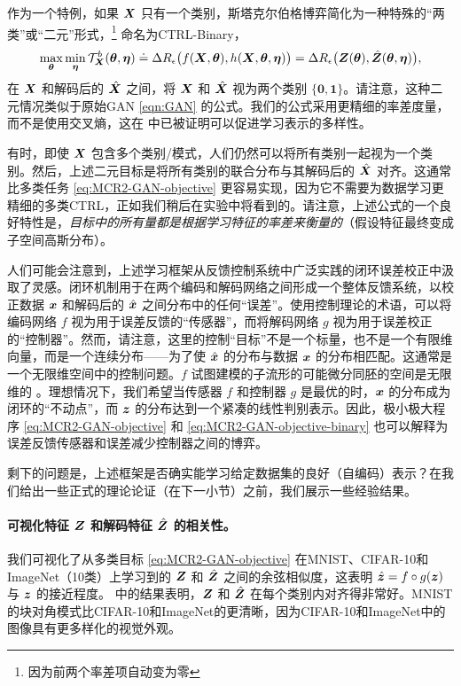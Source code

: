 \documentclass[../../book-main_zh.tex]{subfiles}
\begin{document}
作为一个特例，如果 $\bm{X}$ 只有一个类别，斯塔克尔伯格博弈简化为一种特殊的“两类”或“二元”形式，\footnote{因为前两个率差项自动变为零} 命名为CTRL-Binary，
\begin{equation}
 \max_{\bm \theta} \min_{\bm \eta} \mathcal{T}^b_{\bm{X}}(\bm \theta, \bm \eta) \doteq \Delta R_\epsilon\big(f(\bm{X},\bm \theta), h(\bm{X},\bm \theta,\bm \eta)\big) = \Delta R_\epsilon\big(\bm{Z}(\bm \theta), \hat {\bm{Z}}(\bm \theta, \bm \eta)\big), 
    \label{eq:MCR2-GAN-objective-binary}
\end{equation}
在 $\bm{X}$ 和解码后的 $\hat{\bm{X}}$ 之间，将 $\bm{X}$ 和 $\hat {\bm{X}}$ 视为两个类别 $\{\bm 0, \bm 1\}$。请注意，这种二元情况类似于原始GAN \eqref{eqn:GAN} 的公式。我们的公式采用更精细的率差度量，而不是使用交叉熵，这在  中已被证明可以促进学习表示的多样性。

有时，即使 $\bm{X}$ 包含多个类别/模式，人们仍然可以将所有类别一起视为一个类别。然后，上述二元目标是将所有类别的联合分布与其解码后的 $\hat {\bm{X}}$ 对齐。这通常比多类任务 \eqref{eq:MCR2-GAN-objective} 更容易实现，因为它不需要为数据学习更精细的多类CTRL，正如我们稍后在实验中将看到的。请注意，上述公式的一个良好特性是，{\em 目标中的所有量都是根据学习特征的率差来衡量的}（假设特征最终变成子空间高斯分布）。

人们可能会注意到，上述学习框架从反馈控制系统中广泛实践的闭环误差校正中汲取了灵感。闭环机制用于在两个编码和解码网络之间形成一个整体反馈系统，以校正数据 $\bm{x}$ 和解码后的 $\hat {\bm{x}}$ 之间分布中的任何“误差”。使用控制理论的术语，可以将编码网络 $f$ 视为用于误差反馈的“传感器”，而将解码网络 $g$ 视为用于误差校正的“控制器”。然而，请注意，这里的控制“目标”不是一个标量，也不是一个有限维向量，而是一个连续分布——为了使 $\hat {\bm{x}}$ 的分布与数据 $\bm{x}$ 的分布相匹配。这通常是一个无限维空间中的控制问题。$f$ 试图建模的子流形的可能微分同胚的空间是无限维的 \cite{Lee2002IntroductionTS}。理想情况下，我们希望当传感器 $f$ 和控制器 $g$ 是最优的时，$\bm{x}$ 的分布成为闭环的“不动点”，而 $\bm{z}$ 的分布达到一个紧凑的线性判别表示。因此，极小极大程序 \eqref{eq:MCR2-GAN-objective} 和 \eqref{eq:MCR2-GAN-objective-binary} 也可以解释为误差反馈传感器和误差减少控制器之间的博弈。

剩下的问题是，上述框架是否确实能学习给定数据集的良好（自编码）表示？在我们给出一些正式的理论论证（在下一小节）之前，我们展示一些经验结果。

\paragraph{可视化特征 $\bm{Z}$ 和解码特征 $\hat {\bm{Z}}$ 的相关性。} 我们可视化了从多类目标 \eqref{eq:MCR2-GAN-objective} 在MNIST、CIFAR-10和ImageNet（10类）上学习到的 $\bm{Z}$ 和 $\hat{\bm{Z}}$ 之间的余弦相似度，这表明 $\hat{\bm{z}} = f\circ g(\bm{z})$ 与 $\bm{z}$ 的接近程度。  中的结果表明，$\bm{Z}$ 和 $\hat{\bm{Z}}$ 在每个类别内对齐得非常好。MNIST的块对角模式比CIFAR-10和ImageNet的更清晰，因为CIFAR-10和ImageNet中的图像具有更多样化的视觉外观。
\end{document}
